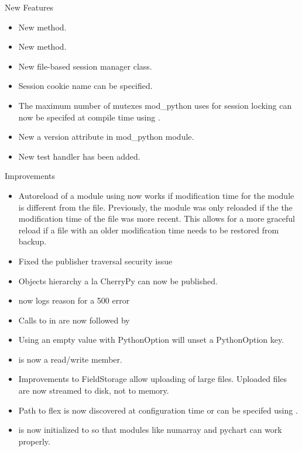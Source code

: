   
  New Features

  \begin{itemize}
    \item
      New  method.
    \item
      New  method.
    \item
      New file-based session manager class.
    \item
      Session cookie name can be specified.
    \item
      The maximum number of mutexes mod_python uses for session locking
      can now be specifed at compile time using 
      .
    \item
      New a version attribute in mod_python module.
    \item
      New test handler  has been added.
  \end{itemize}

  Improvements

  \begin{itemize}
    \item
      Autoreload of a module using  now works if
      modification time for the module is different from the file.
      Previously, the module was only reloaded if the the modification 
      time of the file was more recent. This allows for a more graceful
      reload if a file with an older modification time needs to be
      restored from backup.
    \item
      Fixed the publisher traversal security issue
    \item
      Objects hierarchy a la CherryPy can now be published.
    \item
       now logs reason for a 500 error
    \item
      Calls to  in  are now followed by 
    \item
      Using an empty value with PythonOption will unset a PythonOption key.
    \item
       is now a read/write member.
    \item
      Improvements to FieldStorage allow uploading of large files. Uploaded
      files are now streamed to disk, not to memory.
    \item
      Path to flex is now discovered at configuration time or can be
      specifed using .
    \item
       is now initialized to  so that modules
      like numarray and pychart can work properly.
  \end{itemize}

